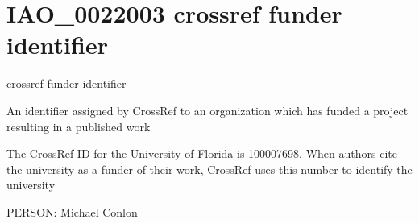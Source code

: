 \documentclass[letterpaper,10pt,english]{sphinxmanual}
\begin{document}
\section{IAO\_0022003 \sphinxhyphen{} crossref funder identifier}
\label{\detokenize{doc-IAO_0022003:iao-0022003-crossref-funder-identifier}}\label{\detokenize{doc-IAO_0022003:index-0}}\label{\detokenize{doc-IAO_0022003::doc}}
\begin{sphinxShadowBox}

\sphinxAtStartPar
crossref funder identifier
\end{sphinxShadowBox}

\begin{sphinxShadowBox}

\sphinxAtStartPar
An identifier assigned by CrossRef to an organization which has funded a project resulting in a published work
\end{sphinxShadowBox}

\begin{sphinxShadowBox}

\sphinxAtStartPar
The CrossRef ID for the University of Florida is 100007698.  When authors cite the university as a funder of their work, CrossRef uses this number to identify the university
\end{sphinxShadowBox}

\begin{sphinxShadowBox}

\sphinxAtStartPar
{}
\end{sphinxShadowBox}

\begin{sphinxShadowBox}

\sphinxAtStartPar
PERSON: Michael Conlon
\end{sphinxShadowBox}
\begin{quote}
\label{\detokenize{doc-IAO_0022006:iao-0022006}}\label{\detokenize{doc-IAO_0022006:dbpedia-identifier}}\label{\detokenize{doc-IAO_0022006:iao-0022006}}
\ignorespaces \end{quote}
\end{document}
